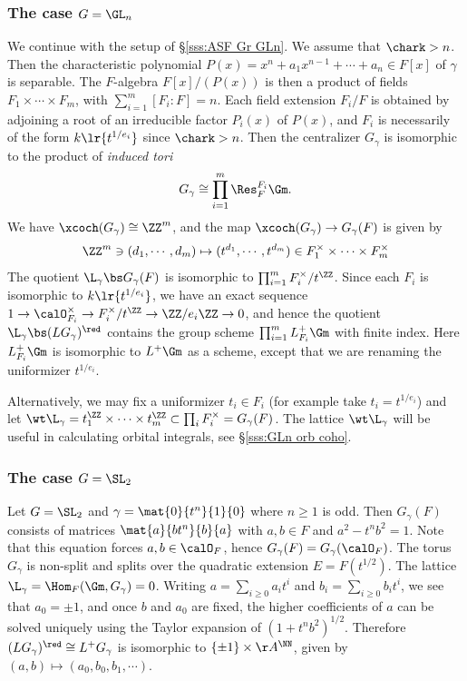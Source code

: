 \subsubsection{The case $G=\GL_{n}$}\label{sss:GLn centralizer} We continue with the setup of \S\ref{sss:ASF Gr GLn}. We assume that $\chark>n$. Then the characteristic polynomial $P(x)=x^{n}+a_{1}x^{n-1}+\cdots+a_{n}\in F[x]$ of $\gamma$ is separable. The $F$-algebra $F[x]/(P(x))$ is then a product of fields $F_{1}\times \cdots \times F_{m}$, with $\sum_{i=1}^{m}[F_{i}:F]=n$. Each field extension $F_{i}/F$ is obtained by adjoining a root of an irreducible factor $P_{i}(x)$ of $P(x)$, and $F_{i}$ is necessarily of the form $k\lr{t^{1/e_{i}}}$ since $\chark>n$. Then the centralizer $G_{\gamma}$ is isomorphic to the product of {\em induced tori}
\begin{equation*}
G_{\gamma}\cong \prod_{i=1}^{m}\Res^{F_{i}}_{F}\Gm.
\end{equation*} 
We have $\xcoch(G_{\gamma})\cong \ZZ^{m}$, and the map $\xcoch(G_{\gamma})\to G_{\gamma}(F)$ is given by
\begin{equation*}
\ZZ^{m}\ni(d_{1},\cdots, d_{m})\mapsto (t^{d_{1}},\cdots, t^{d_{m}})\in F^{\times}_{1}\times\cdots\times F^{\times}_{m}
\end{equation*}
The quotient $\L_{\gamma}\bs G_{\gamma}(F)$ is isomorphic to $\prod_{i=1}^{m}F^{\times}_{i}/t^{\ZZ}$. Since each $F_{i}$ is isomorphic to $k\lr{t^{1/e_{i}}}$, we have  an exact sequence $1\to \calO^{\times}_{F_{i}}\to F^{\times}_{i}/t^{\ZZ}\to \ZZ/e_{i}\ZZ\to 0$, and hence the quotient $\L_{\gamma}\bs (LG_{\gamma})^{\red}$  contains the group scheme $\prod_{i=1}^{m}L^{+}_{F_{i}}\Gm$ with finite index. Here $L^{+}_{F_{i}}\Gm$ is isomorphic to $L^{+}\Gm$ as a scheme, except that we are renaming the uniformizer $t^{1/e_{i}}$. 

Alternatively, we may fix a uniformizer $t_{i}\in F_{i}$ (for example take $t_{i}=t^{1/e_{i}}$) and let $\wt\L_{\gamma}=t_{1}^{\ZZ}\times\cdots\times t^{\ZZ}_{m}\subset \prod_{i}F_{i}^{\times}=G_{\gamma}(F)$. The lattice $\wt\L_{\gamma}$ will be useful in calculating orbital integrals, see \S\ref{sss:GLn orb coho}.


\subsubsection{The case $G=\SL_{2}$} Let $G=\SL_{2}$ and $\gamma=\mat{0}{t^{n}}{1}{0}$ where $n\geq 1$ is odd. Then $G_{\gamma}(F)$ consists of matrices $\mat{a}{bt^{n}}{b}{a}$ with $a,b\in F$ and $a^{2}-t^{n}b^{2}=1$. Note that this equation forces $a,b\in\calO_{F}$, hence $G_{\gamma}(F)=G_{\gamma}(\calO_{F})$. The torus $G_{\gamma}$ is non-split and splits over the quadratic extension $E=F(t^{1/2})$. The lattice $\L_{\gamma}=\Hom_{F}(\Gm,G_{\gamma})=0$. Writing $a=\sum_{i\geq0}a_{i}t^{i}$ and $b_{i}=\sum_{i\geq 0}b_{i}t^{i}$, we see that $a_{0}=\pm1$, and once $b$ and $a_{0}$ are fixed, the higher coefficients of $a$ can be solved uniquely using the Taylor expansion of $(1+t^{n}b^{2})^{1/2}$. Therefore $(LG_{\gamma})^{\red}\cong L^{+}G_{\gamma}$ is isomorphic to $\{\pm1\}\times \AA^{\NN}$, given by $(a,b)\mapsto (a_{0},b_{0},b_{1},\cdots)$. 



